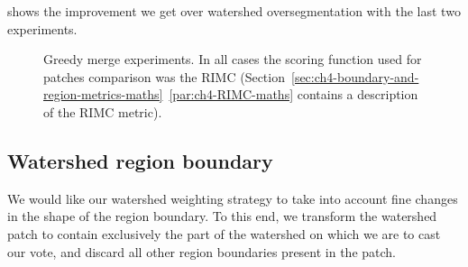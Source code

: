  shows the improvement we get over watershed oversegmentation with the last two experiments.

\begin{figure}[ht!]
\centering
\caption[Greedy merge experiments]{Greedy merge experiments. In all cases the scoring function used for patches comparison was the RIMC (Section~\ref*{sec:ch4-boundary-and-region-metrics-maths}~\ref{par:ch4-RIMC-maths} contains a description of the RIMC metric).} %
\label{fig:segs-to-greedy-merge-RIMC}
\end{figure}

\subsection{Watershed region boundary}
We would like our watershed weighting strategy to take into account fine changes in the shape of the region boundary. To this end, we transform the watershed patch to contain exclusively the part of the watershed on which we are to cast our vote, and discard all other region boundaries present in the patch.

